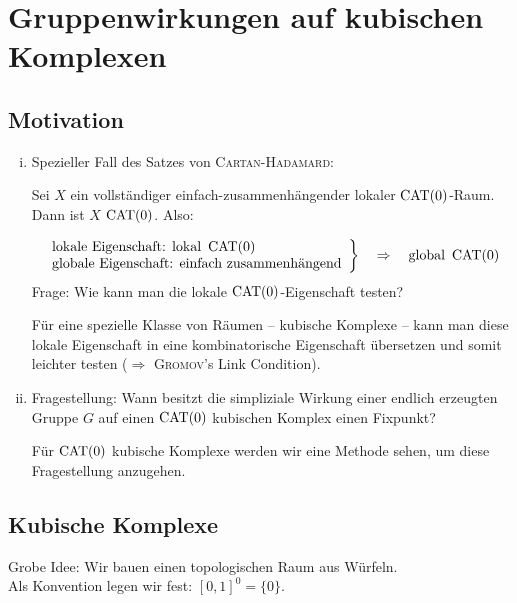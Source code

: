 \section{Gruppenwirkungen auf kubischen Komplexen}
\label{cha:3}

\subsection*{Motivation}
\begin{enumerate}[(i)]
	\item Spezieller Fall des Satzes von \textsc{Cartan-Hadamard}: 
	
	Sei $X$ ein vollständiger einfach-zusammenhängender lokaler $\operatorname{CAT(0)}$-Raum.
	Dann ist $X$ $\operatorname{CAT(0)}$. Also:
	
	\[
		\left. \begin{array}{l}
			\text{lokale Eigenschaft: lokal } \operatorname{CAT(0)} \\
			\text{globale Eigenschaft: einfach zusammenhängend}
		\end{array} \right\} \quad \Rightarrow \quad \text{global } \operatorname{CAT(0)}
	\]
	Frage: Wie kann man die lokale $\operatorname{CAT(0)}$-Eigenschaft testen?
	
	Für eine spezielle Klasse von Räumen -- kubische Komplexe -- kann man diese lokale Eigenschaft in eine kombinatorische Eigenschaft übersetzen und somit leichter testen ($\Rightarrow$ \textsc{Gromov}'s Link Condition).
	\item Fragestellung: Wann besitzt die simpliziale Wirkung einer endlich erzeugten Gruppe $G$ auf einen $\operatorname{CAT(0)}$ kubischen Komplex einen Fixpunkt?
	
	Für $\operatorname{CAT(0)}$ kubische Komplexe werden wir eine Methode sehen, um diese Fragestellung anzugehen.
\end{enumerate}

\subsection{Kubische Komplexe}
\label{sec:3.1}
	Grobe Idee: Wir bauen einen topologischen Raum aus Würfeln.\\
	Als Konvention legen wir fest: $[0,1]^0 = \{0\}$.
	
